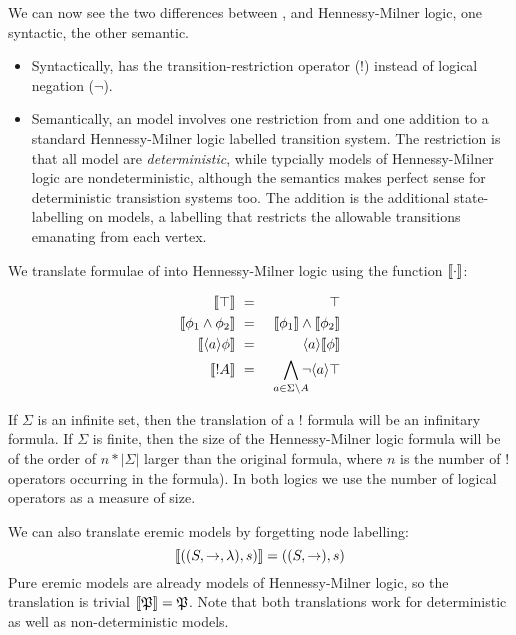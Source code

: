 \NI We can now see the two differences between \ELFULL{}, and
Hennessy-Milner logic, one syntactic, the other semantic.

\begin{itemize}

\item Syntactically, \ELABR{} has the transition-restriction operator ($!$)
  instead of logical negation ($\neg$).

\item Semantically, an \ELABR{} model involves one restriction from
  and one addition to a standard Hennessy-Milner logic labelled transition system. The
  restriction is that all \ELABR{} model are \emph{deterministic},
  while typcially models of Hennessy-Milner logic are
  nondeterministic, although the semantics makes perfect sense for
  deterministic transistion systems too. The addition is the
  additional state-labelling on \ELABR{} models, a labelling that
  restricts the allowable transitions emanating from each vertex.

\end{itemize}

\NI We translate formulae of \ELABR{} into Hennessy-Milner logic using the function
$\lbrack\!\lbrack \cdot \rbrack\!\rbrack$:

\begin{eqnarray*}
  \SEMB{\top} & \ = \ & \top  \\
  \SEMB{\phi_1 \AND \phi_2} & \ = \ & \SEMB{\phi_1} \AND \SEMB{\phi_2}  \\
  \SEMB{\langle a \rangle \phi} & \ = \ & \langle a \rangle \SEMB{\phi}  \\
  \SEMB{! A} & \ = \ & \bigwedge_{a \in \Sigma \setminus A}\!\!\!\! \neg \langle a \rangle \top 
\end{eqnarray*}

\NI If $\Sigma$ is an infinite set, then the translation of a $!$
formula will be an infinitary formula.  If $\Sigma$ is finite, then
the size of the Hennessy-Milner logic formula will be of the order of $n * | \Sigma |$
larger than the original \ELABR{} formula, where $n$ is the number of
$!$ operators occurring in the \ELABR{} formula). In both logics we
use the number of logical operators as a measure of size.

We can also translate eremic models by forgetting node labelling:
\[
   \lbrack\!\lbrack ((S, \rightarrow, \lambda), s) \rbrack\!\rbrack 
      =
   ((S, \rightarrow), s)
\]
Pure eremic models are already models of Hennessy-Milner logic, so the
translation is trivial $\lbrack\!\lbrack \frak{P} \rbrack\!\rbrack = \frak{P}$. Note that both
translations work for deterministic as well as non-deterministic
models.

